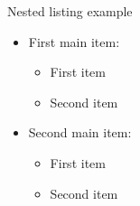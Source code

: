 \begin{frame}{Nested listing example}

\begin{itemize}

  \item First main item:

  \begin{itemize}
    \item First item
    \item Second item
  \end{itemize}
  
  \vspace{0.6cm}

  \item Second main item:

  \begin{itemize}
    \item First item
    \item Second item
  \end{itemize}

\end{itemize}

\end{frame}